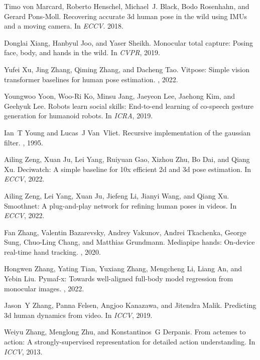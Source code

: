 \documentclass[10pt,twocolumn,letterpaper]{article}
\begin{document}
\begin{thebibliography}{10}
Timo von Marcard, Roberto Henschel, Michael~J. Black, Bodo Rosenhahn, and
  Gerard Pons-Moll.
\newblock Recovering accurate 3d human pose in the wild using {IMUs} and a
  moving camera.
\newblock In {\em ECCV}. 2018.

Donglai Xiang, Hanbyul Joo, and Yaser Sheikh.
\newblock Monocular total capture: Posing face, body, and hands in the wild.
\newblock In {\em CVPR}, 2019.

Yufei Xu, Jing Zhang, Qiming Zhang, and Dacheng Tao.
\newblock Vitpose: Simple vision transformer baselines for human pose
  estimation.
, 2022.

Youngwoo Yoon, Woo-Ri Ko, Minsu Jang, Jaeyeon Lee, Jaehong Kim, and Geehyuk
  Lee.
\newblock Robots learn social skills: End-to-end learning of co-speech gesture
  generation for humanoid robots.
\newblock In {\em ICRA}, 2019.

Ian~T Young and Lucas~J Van~Vliet.
\newblock Recursive implementation of the gaussian filter.
, 1995.

Ailing Zeng, Xuan Ju, Lei Yang, Ruiyuan Gao, Xizhou Zhu, Bo Dai, and Qiang Xu.
\newblock Deciwatch: A simple baseline for 10x efficient 2d and 3d pose
  estimation.
\newblock In {\em ECCV}, 2022.

Ailing Zeng, Lei Yang, Xuan Ju, Jiefeng Li, Jianyi Wang, and Qiang Xu.
\newblock Smoothnet: A plug-and-play network for refining human poses in
  videos.
\newblock In {\em ECCV}, 2022.

Fan Zhang, Valentin Bazarevsky, Andrey Vakunov, Andrei Tkachenka, George Sung,
  Chuo-Ling Chang, and Matthias Grundmann.
\newblock Mediapipe hands: On-device real-time hand tracking.
, 2020.

Hongwen Zhang, Yating Tian, Yuxiang Zhang, Mengcheng Li, Liang An, and Yebin
  Liu.
\newblock Pymaf-x: Towards well-aligned full-body model regression from
  monocular images.
, 2022.

Jason~Y Zhang, Panna Felsen, Angjoo Kanazawa, and Jitendra Malik.
\newblock Predicting 3d human dynamics from video.
\newblock In {\em ICCV}, 2019.

Weiyu Zhang, Menglong Zhu, and Konstantinos~G Derpanis.
\newblock From actemes to action: A strongly-supervised representation for
  detailed action understanding.
\newblock In {\em ICCV}, 2013.


\end{thebibliography}
\end{document}
